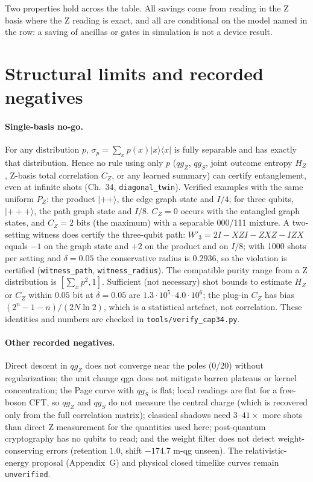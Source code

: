 \documentclass[11pt]{article}
\newcommand{\qgZ}{qg_Z}
\newcommand{\qgS}{qg_S}
\newcommand{\st}[1]{\texttt{#1}}
\begin{document}
\endgroup
Two properties hold across the table. All savings come from reading in the Z basis where the Z reading is exact, and all are conditional on the model named in the row: a saving of ancillas or gates in simulation is not a device result.

\section{Structural limits and recorded negatives}
\paragraph{Single-basis no-go.} For any distribution $p$, $\sigma_p=\sum_xp(x)|x\rangle\langle x|$ is fully separable and has exactly that distribution. Hence no rule using only $p$ ($\qgZ$, $\qgS$, joint outcome entropy $H_Z$, Z-basis total correlation $C_Z$, or any learned summary) can certify entanglement, even at infinite shots (Ch.~34, \st{diagonal\_twin}). Verified examples with the same uniform $P_Z$: the product $|{+}{+}\rangle$, the edge graph state and $I/4$; for three qubits, $|{+}{+}{+}\rangle$, the path graph state and $I/8$. $C_Z=0$ occurs with the entangled graph states, and $C_Z=2$ bits (the maximum) with a separable 000/111 mixture. A two-setting witness does certify the three-qubit path: $W'_3=2I-XZI-ZXZ-IZX$ equals $-1$ on the graph state and $+2$ on the product and on $I/8$; with 1000 shots per setting and $\delta=0.05$ the conservative radius is $0.2936$, so the violation is certified (\st{witness\_path}, \st{witness\_radius}). The compatible purity range from a Z distribution is $[\sum_xp^2,1]$. Sufficient (not necessary) shot bounds to estimate $H_Z$ or $C_Z$ within $0.05$ bit at $\delta=0.05$ are $1.3\cdot10^5$--$4.0\cdot10^6$; the plug-in $C_Z$ has bias $(2^n-1-n)/(2N\ln2)$, which is a statistical artefact, not correlation. These identities and numbers are checked in \texttt{tools/verify\_cap34.py}.

\paragraph{Other recorded negatives.} Direct descent in $\qgZ$ does not converge near the poles (0/20) without regularization; the unit change qga does not mitigate barren plateaus or kernel concentration; the Page curve with $\qgS$ is flat; local readings are flat for a free-boson CFT, so $\qgZ$ and $\qgS$ do not measure the central charge (which is recovered only from the full correlation matrix); classical shadows need $3$--$41\times$ more shots than direct Z measurement for the quantities used here; post-quantum cryptography has no qubits to read; and the weight filter does not detect weight-conserving errors (retention $1.0$, shift $-174.7$ m-qg unseen). The relativistic-energy proposal (Appendix~G) and physical closed timelike curves remain \st{unverified}.
\end{document}

